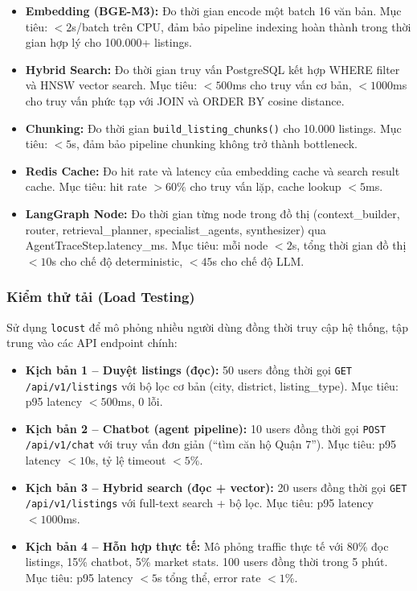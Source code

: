 \begin{itemize}
    \item \textbf{Embedding (BGE-M3):} Đo thời gian encode một batch 16 văn bản. Mục tiêu: $<2$s/batch trên CPU, đảm bảo pipeline indexing hoàn thành trong thời gian hợp lý cho 100.000+ listings.

    \item \textbf{Hybrid Search:} Đo thời gian truy vấn PostgreSQL kết hợp WHERE filter và HNSW vector search. Mục tiêu: $<500$ms cho truy vấn cơ bản, $<1000$ms cho truy vấn phức tạp với JOIN và ORDER BY cosine distance.

    \item \textbf{Chunking:} Đo thời gian \texttt{build\_listing\_chunks()} cho 10.000 listings. Mục tiêu: $<5$s, đảm bảo pipeline chunking không trở thành bottleneck.

    \item \textbf{Redis Cache:} Đo hit rate và latency của embedding cache và search result cache. Mục tiêu: hit rate $>60\%$ cho truy vấn lặp, cache lookup $<5$ms.

    \item \textbf{LangGraph Node:} Đo thời gian từng node trong đồ thị (context\_builder, router, retrieval\_planner, specialist\_agents, synthesizer) qua AgentTraceStep.latency\_ms. Mục tiêu: mỗi node $<2$s, tổng thời gian đồ thị $<10$s cho chế độ deterministic, $<45$s cho chế độ LLM.
\end{itemize}

\subsubsection*{Kiểm thử tải (Load Testing)}

Sử dụng \texttt{locust} để mô phỏng nhiều người dùng đồng thời truy cập hệ thống, tập trung vào các API endpoint chính:

\begin{itemize}
    \item \textbf{Kịch bản 1 -- Duyệt listings (đọc):} 50 users đồng thời gọi \texttt{GET /api/v1/listings} với bộ lọc cơ bản (city, district, listing\_type). Mục tiêu: p95 latency $<500$ms, 0 lỗi.

    \item \textbf{Kịch bản 2 -- Chatbot (agent pipeline):} 10 users đồng thời gọi \texttt{POST /api/v1/chat} với truy vấn đơn giản (``tìm căn hộ Quận 7''). Mục tiêu: p95 latency $<10$s, tỷ lệ timeout $<5\%$.

    \item \textbf{Kịch bản 3 -- Hybrid search (đọc + vector):} 20 users đồng thời gọi \texttt{GET /api/v1/listings} với full-text search + bộ lọc. Mục tiêu: p95 latency $<1000$ms.

    \item \textbf{Kịch bản 4 -- Hỗn hợp thực tế:} Mô phỏng traffic thực tế với 80\% đọc listings, 15\% chatbot, 5\% market stats. 100 users đồng thời trong 5 phút. Mục tiêu: p95 latency $<5$s tổng thể, error rate $<1\%$.
\end{itemize}

